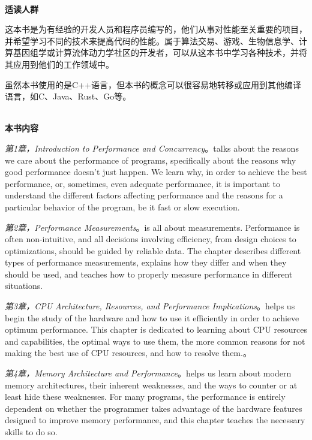 \hspace*{\fill} \\ %
\noindent\textbf{适读人群}

这本书是为有经验的开发人员和程序员编写的，他们从事对性能至关重要的项目，并希望学习不同的技术来提高代码的性能。属于算法交易、游戏、生物信息学、计算基因组学或计算流体动力学社区的开发者，可以从这本书中学习各种技术，并将其应用到他们的工作领域中。

虽然本书使用的是C++语言，但本书的概念可以很容易地转移或应用到其他编译语言，如C、Java、Rust、Go等。

\hspace*{\fill} \\ %
\textbf{本书内容}

\textit{第1章，Introduction to Performance and Concurrency}。talks about the reasons we care about the performance of programs, specifically about the reasons why good performance doesn't just happen. We learn why, in order to achieve the best performance, or, sometimes, even adequate performance, it is important to understand the different factors affecting performance and the reasons for a particular behavior of the program, be it fast or slow execution.

\textit{第2章，Performance Measurements}。is all about measurements. Performance is often non-intuitive, and all decisions involving efficiency, from design choices to optimizations, should be guided by reliable data. The chapter describes different types of performance measurements, explains how they differ and when they should be used, and teaches how to properly measure performance in different situations.

\textit{第3章，CPU Architecture, Resources, and Performance Implications}。helps us begin the study of the hardware and how to use it efficiently in order to achieve optimum performance. This chapter is dedicated to learning about CPU resources and capabilities, the optimal ways to use them, the more common reasons for not making the best use of CPU resources, and how to resolve them.。

\textit{第4章，Memory Architecture and Performance}。helps us learn about modern memory architectures, their inherent weaknesses, and the ways to counter or at least hide these weaknesses. For many programs, the performance is entirely dependent on whether the programmer takes advantage of the hardware features designed to improve memory performance, and this chapter teaches the necessary skills to do so.

